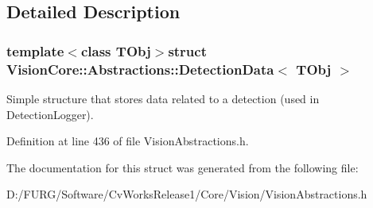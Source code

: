 \subsection{Detailed Description}
\subsubsection*{template$<$class T\+Obj$>$struct Vision\+Core\+::\+Abstractions\+::\+Detection\+Data$<$ T\+Obj $>$}

Simple structure that stores data related to a detection (used in Detection\+Logger). 

Definition at line 436 of file Vision\+Abstractions.\+h.



The documentation for this struct was generated from the following file\+:\begin{DoxyCompactItemize}
\item 
D\+:/\+F\+U\+R\+G/\+Software/\+Cv\+Works\+Release1/\+Core/\+Vision/Vision\+Abstractions.\+h\end{DoxyCompactItemize}

